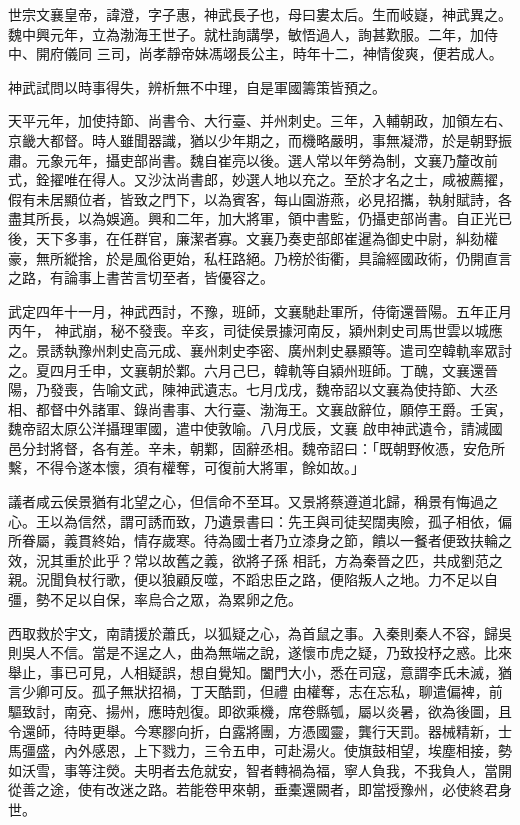 
\begin{pinyinscope}

 世宗文襄皇帝，諱澄，字子惠，神武長子也，母曰婁太后。生而岐嶷，神武異之。魏中興元年，立為渤海王世子。就杜詢講學，敏悟過人，詢甚歎服。二年，加侍中、開府儀同
 三司，尚孝靜帝妹馮翊長公主，時年十二，神情俊爽，便若成人。



 神武試問以時事得失，辨析無不中理，自是軍國籌策皆預之。



 天平元年，加使持節、尚書令、大行臺、并州刺史。三年，入輔朝政，加領左右、京畿大都督。時人雖聞器識，猶以少年期之，而機略嚴明，事無凝滯，於是朝野振肅。元象元年，攝吏部尚書。魏自崔亮以後。選人常以年勞為制，文襄乃釐改前式，銓擢唯在得人。又沙汰尚書郎，妙選人地以充之。至於才名之士，咸被薦擢，
 假有未居顯位者，皆致之門下，以為賓客，每山園游燕，必見招攜，執射賦詩，各盡其所長，以為娛適。興和二年，加大將軍，領中書監，仍攝吏部尚書。自正光已後，天下多事，在任群官，廉潔者寡。文襄乃奏吏部郎崔暹為御史中尉，糾劾權豪，無所縱捨，於是風俗更始，私枉路絕。乃榜於街衢，具論經國政術，仍開直言之路，有論事上書苦言切至者，皆優容之。



 武定四年十一月，神武西討，不豫，班師，文襄馳赴軍所，侍衛還晉陽。五年正月丙午，
 神武崩，秘不發喪。辛亥，司徒侯景據河南反，潁州刺史司馬世雲以城應之。景誘執豫州刺史高元成、襄州刺史李密、廣州刺史暴顯等。遣司空韓軌率眾討之。夏四月壬申，文襄朝於鄴。六月己巳，韓軌等自潁州班師。丁醜，文襄還晉陽，乃發喪，告喻文武，陳神武遺志。七月戊戌，魏帝詔以文襄為使持節、大丞相、都督中外諸軍、錄尚書事、大行臺、渤海王。文襄啟辭位，願停王爵。壬寅，魏帝詔太原公洋攝理軍國，遣中使敦喻。八月戊辰，文襄
 啟申神武遺令，請減國邑分封將督，各有差。辛未，朝鄴，固辭丞相。魏帝詔曰：「既朝野攸憑，安危所繫，不得令遂本懷，須有權奪，可復前大將軍，餘如故。」



 議者咸云侯景猶有北望之心，但信命不至耳。又景將蔡遵道北歸，稱景有悔過之心。王以為信然，謂可誘而致，乃遺景書曰：先王與司徒契闊夷險，孤子相依，偏所眷屬，義貫終始，情存歲寒。待為國士者乃立漆身之節，饋以一餐者便致扶輪之效，況其重於此乎？常以故舊之義，欲將子孫
 相託，方為秦晉之匹，共成劉范之親。況聞負杖行歌，便以狼顧反噬，不蹈忠臣之路，便陷叛人之地。力不足以自彊，勢不足以自保，率烏合之眾，為累卵之危。



 西取救於宇文，南請援於蕭氏，以狐疑之心，為首鼠之事。入秦則秦人不容，歸吳則吳人不信。當是不逞之人，曲為無端之說，遂懷市虎之疑，乃致投杼之惑。比來舉止，事已可見，人相疑誤，想自覺知。闔門大小，悉在司寇，意謂李氏未滅，猶言少卿可反。孤子無狀招禍，丁天酷罰，但禮
 由權奪，志在忘私，聊遣偏裨，前驅致討，南兗、揚州，應時剋復。即欲乘機，席卷縣瓠，屬以炎暑，欲為後圖，且令還師，待時更舉。今寒膠向折，白露將團，方憑國靈，龔行天罰。器械精新，士馬彊盛，內外感恩，上下戮力，三令五申，可赴湯火。使旗鼓相望，埃塵相接，勢如沃雪，事等注熒。夫明者去危就安，智者轉禍為福，寧人負我，不我負人，當開從善之途，使有改迷之路。若能卷甲來朝，垂橐還闕者，即當授豫州，必使終君身世。




\end{pinyinscope}
